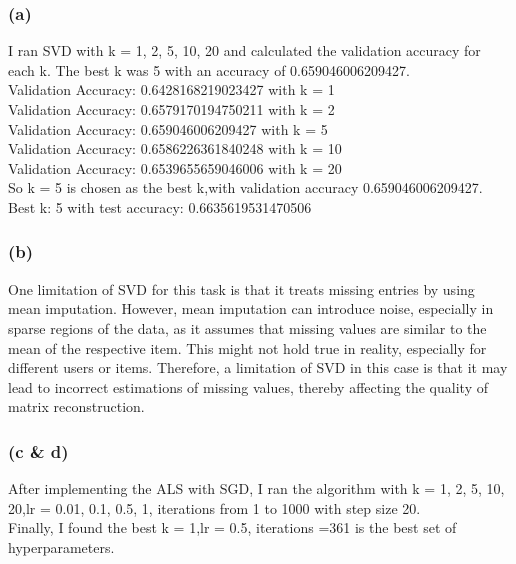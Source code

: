 \documentclass[12pt]{article}
\begin{document}
\subsubsection*{(a)}
I ran SVD with k = 1, 2, 5, 10, 20 and calculated the validation accuracy for each k. The best k was 5 with an accuracy of 0.659046006209427.\\
Validation Accuracy: 0.6428168219023427 with k = 1\\
Validation Accuracy: 0.6579170194750211 with k = 2\\
Validation Accuracy: 0.659046006209427 with k = 5\\
Validation Accuracy: 0.6586226361840248 with k = 10\\
Validation Accuracy: 0.6539655659046006 with k = 20\\
So k = 5 is chosen as the best k,with validation accuracy 0.659046006209427.\\
Best k: 5 with test accuracy: 0.6635619531470506\\

\subsubsection*{(b)}
One limitation of SVD for this task is that it treats missing entries by using mean imputation. However,
mean imputation can introduce noise, especially in sparse regions of the data, as it assumes that missing values are similar
to the mean of the respective item. This might not hold true in reality, especially for different users or items. Therefore,
a limitation of SVD in this case is that it may lead to incorrect estimations of missing values, thereby affecting the quality
of matrix reconstruction.


\subsubsection*{(c \& d)}
After implementing the ALS with SGD, I ran the algorithm with k = 1, 2, 5, 10, 20,lr = 0.01, 0.1, 0.5, 1, iterations from 1 to 1000 with step size 20.\\
Finally, I found the best k = 1,lr = 0.5, iterations =361 is the best set of hyperparameters.\\
\end{document}
